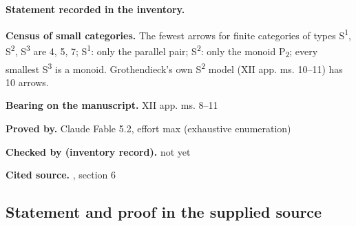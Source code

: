 
\label{nr:entry6}

\noindent\textbf{Statement recorded in the inventory.}\par\smallskip

\textbf{Census of small categories.} The fewest arrows for finite categories of types S\textsuperscript{1}, S\textsuperscript{2}, S\textsuperscript{3} are 4, 5, 7; S\textsuperscript{1}: only the parallel pair; S\textsuperscript{2}: only the monoid P\textsubscript{2}; every smallest S\textsuperscript{3} is a monoid. Grothendieck's own S\textsuperscript{2} model (XII app. ms. 10--11) has 10 arrows.


\noindent\textbf{Bearing on the manuscript.} XII app. ms. 8--11\par\smallskip

\noindent\textbf{Proved by.} Claude Fable 5.2, effort max (exhaustive enumeration)\par

\noindent\textbf{Checked by (inventory record).} not yet\par\smallskip

\noindent\textbf{Cited source.} , section 6\par\medskip

\subsection*{Statement and proof in the supplied source}

